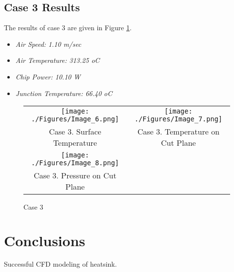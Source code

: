 \documentclass[letterpaper,12pt]{article}
\begin{document}
\subsection{Case 3 Results}
The results of case 3 are given in Figure \ref{fig:case 3}.\\
\begin{itemize}
\item{\emph{Air Speed: 1.10 m/sec}}

\item{\emph{Air Temperature: 313.25 oC}}

\item{\emph{Chip Power: 10.10 W}}

\item{\emph{Junction Temperature: 66.40 oC}}

\end{itemize}
\begin{figure}[!h!tbp]
\begin{center}
\begin{tabular}{ c c }
\texttt{[image: ./Figures/Image\_6.png]}
 & \texttt{[image: ./Figures/Image\_7.png]}
 \\ Case 3. Surface Temperature & Case 3. Temperature on Cut Plane \\
\texttt{[image: ./Figures/Image\_8.png]}
 &  \\ Case 3. Pressure on Cut Plane &  \\
\end{tabular}
\caption{\label{fig:case 3}
Case 3}
\end{center}
\end{figure}
\vfill
\newpage
\clearpage
\section{Conclusions}


Successful CFD modeling of heatsink.
\\
\end{document}
